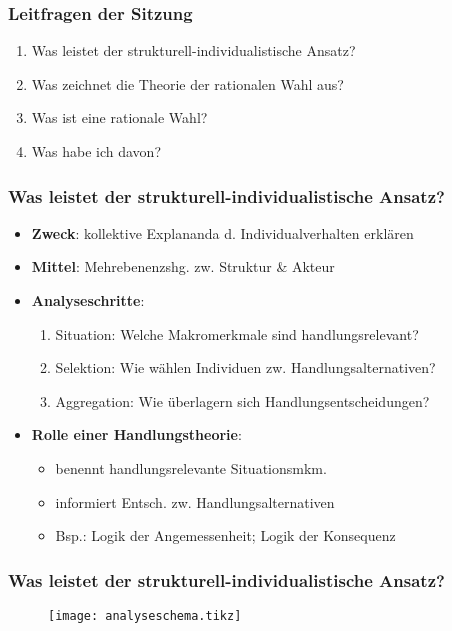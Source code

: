 \documentclass{beamer}
\begin{document}
\maketitle

\begin{frame}
  \frametitle{Leitfragen der Sitzung}
  \begin{enumerate}
    \item Was leistet der strukturell-individualistische Ansatz?
    \item Was zeichnet die Theorie der rationalen Wahl aus?
    \item Was ist eine rationale Wahl?
    \item Was habe ich davon?
  \end{enumerate}
\end{frame}

\begin{frame}
  \frametitle{Was leistet der strukturell-individualistische Ansatz?}
  \begin{itemize}
    \item \textbf{Zweck}: kollektive Explananda d. Individualverhalten erklären
    \item \textbf{Mittel}: Mehrebenenzshg. zw. Struktur \& Akteur
    \item \textbf{Analyseschritte}:
    \begin{enumerate}
      \item Situation: Welche Makromerkmale sind handlungsrelevant?
      \item Selektion: Wie wählen Individuen zw. Handlungsalternativen?
      \item Aggregation: Wie überlagern sich Handlungsentscheidungen?
    \end{enumerate}
    \item \textbf{Rolle einer Handlungstheorie}:
    \begin{itemize}
      \item benennt handlungsrelevante Situationsmkm.
      \item informiert Entsch. zw. Handlungsalternativen
      \item Bsp.: Logik der Angemessenheit; Logik der Konsequenz
    \end{itemize}
  \end{itemize}
\end{frame}

\begin{frame}
  \frametitle{Was leistet der strukturell-individualistische Ansatz?}
  \begin{figure}
  \centering
    \texttt{[image: analyseschema.tikz]}
  \end{figure}
\end{frame}
\end{document}
